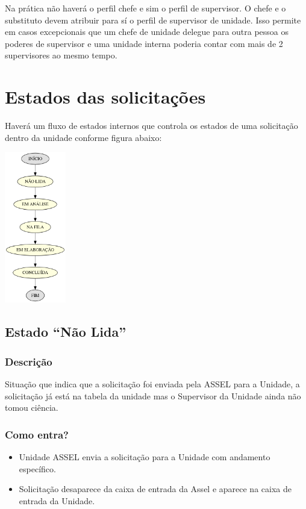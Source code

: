 Na prática não haverá o perfil chefe e sim o perfil de supervisor. O chefe e o substituto devem atribuir para sí o perfil de supervisor de unidade. Isso permite em casos excepcionais que um chefe de unidade delegue para outra pessoa os poderes de supervisor e uma unidade interna poderia contar com mais de 2 supervisores ao mesmo tempo.

\section{Estados das solicitações}

Haverá um fluxo de estados internos que controla os estados de uma solicitação dentro da unidade conforme figura abaixo:

\begin{center}
	\includegraphics[width=0.2\textwidth]{fig/fluxoBasico.png}
\end{center}

\subsection{Estado ``Não Lida''}

\subsubsection*{Descrição}

Situação que indica que a solicitação foi enviada pela ASSEL para a Unidade, a solicitação já está na tabela da unidade mas o Supervisor da Unidade ainda não tomou ciência.

\subsubsection*{Como entra?}

\begin{itemize}
	\item Unidade ASSEL envia a solicitação para a Unidade com andamento específico. 
	\item Solicitação desaparece da caixa de entrada da Assel e aparece na caixa de entrada da Unidade.
\end{itemize}

